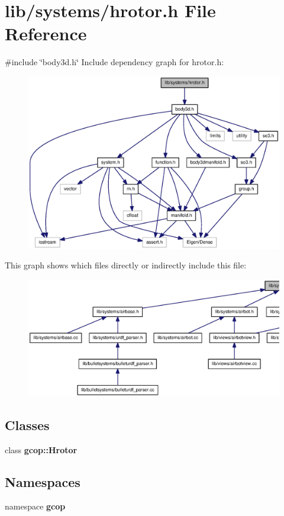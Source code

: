\section{lib/systems/hrotor.h \-File \-Reference}
\label{hrotor_8h}
{\ttfamily \#include \char`\"{}body3d.\-h\char`\"{}}\*
\-Include dependency graph for hrotor.\-h\-:\nopagebreak
\begin{figure}[H]
\begin{center}
\leavevmode
\includegraphics[width=350pt]{hrotor_8h__incl}
\end{center}
\end{figure}
\-This graph shows which files directly or indirectly include this file\-:
\nopagebreak
\begin{figure}[H]
\begin{center}
\leavevmode
\includegraphics[width=350pt]{hrotor_8h__dep__incl}
\end{center}
\end{figure}
\subsection*{\-Classes}
\begin{DoxyCompactItemize}
\item 
class {\bf gcop\-::\-Hrotor}
\end{DoxyCompactItemize}
\subsection*{\-Namespaces}
\begin{DoxyCompactItemize}
\item 
namespace {\bf gcop}
\end{DoxyCompactItemize}
